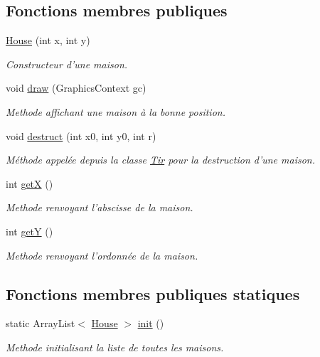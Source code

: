 \subsection*{Fonctions membres publiques}
\begin{DoxyCompactItemize}
\item 
\hyperlink{class_house_aec83bd8191e1fa3ea56f7428445cc78a}{House} (int x, int y)
\begin{DoxyCompactList}\small\item\em Constructeur d'une maison. \end{DoxyCompactList}\item 
void \hyperlink{class_house_a9456283e7505b505f8efb1ec75a0435a}{draw} (Graphics\-Context gc)
\begin{DoxyCompactList}\small\item\em Methode affichant une maison à la bonne position. \end{DoxyCompactList}\item 
void \hyperlink{class_house_ac13ee7b6abda22ca38acde2b394bdad7}{destruct} (int x0, int y0, int r)
\begin{DoxyCompactList}\small\item\em Méthode appelée depuis la classe \hyperlink{class_tir}{Tir} pour la destruction d'une maison. \end{DoxyCompactList}\item 
int \hyperlink{class_house_ac4d6f6fa84cdf4ae34c870a3fddfcbb3}{get\-X} ()
\begin{DoxyCompactList}\small\item\em Methode renvoyant l'abscisse de la maison. \end{DoxyCompactList}\item 
int \hyperlink{class_house_ae416ab0d84b498a9d1fd5c02a751bf4f}{get\-Y} ()
\begin{DoxyCompactList}\small\item\em Methode renvoyant l'ordonnée de la maison. \end{DoxyCompactList}\end{DoxyCompactItemize}
\subsection*{Fonctions membres publiques statiques}
\begin{DoxyCompactItemize}
\item 
static Array\-List$<$ \hyperlink{class_house}{House} $>$ \hyperlink{class_house_a443ed9f0805cbfe9a2b2ce8da60fcbae}{init} ()
\begin{DoxyCompactList}\small\item\em Methode initialisant la liste de toutes les maisons. \end{DoxyCompactList}\end{DoxyCompactItemize}


